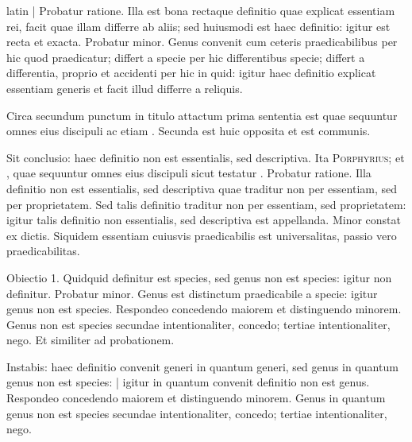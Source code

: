 \begin{otherlanguage*}{latin}
\pstart
\textnormal{|} Probatur ratione. Illa est bona rectaque definitio quae explicat essentiam rei, facit quae illam differre ab aliis; sed huiusmodi est haec definitio:
igitur est recta et exacta. Probatur minor. Genus convenit cum ceteris praedicabilibus per hic quod praedicatur; differt a specie per hic differentibus specie; differt a differentia, proprio et accidenti per hic in quid:
igitur haec definitio explicat essentiam generis et facit illud differre a reliquis. 
\pend

\pstart
Circa secundum punctum in titulo attactum prima sententia est  quae sequuntur omnes eius discipuli ac etiam . Secunda est huic opposita et est communis. 
\pend

\pstart
Sit conclusio:
haec definitio non est essentialis, sed descriptiva. Ita \textsc{Porphyrius};  et , quae sequuntur omnes eius discipuli sicut testatur . Probatur ratione. Illa definitio non est essentialis, sed descriptiva quae traditur non per essentiam, sed per proprietatem. Sed talis definitio traditur non per essentiam, sed proprietatem:
igitur talis definitio non essentialis, sed descriptiva est appellanda. Minor constat ex dictis. Siquidem essentiam cuiusvis praedicabilis est universalitas, passio vero praedicabilitas. 
\pend

\pstart
Obiectio 1. Quidquid definitur est species, sed genus non est species:
igitur non definitur. Probatur minor. Genus est distinctum praedicabile a specie:
igitur genus non est species. Respondeo concedendo maiorem et distinguendo minorem. Genus non est species secundae intentionaliter, concedo; tertiae intentionaliter, nego. Et similiter ad probationem. 
\pend

\pstart
Instabis:
haec definitio convenit generi in quantum generi, sed genus in quantum genus non est species:
\textnormal{|} igitur in quantum convenit definitio non est genus. Respondeo concedendo maiorem et distinguendo minorem. Genus in quantum genus non est species secundae intentionaliter, concedo; tertiae intentionaliter, nego. 
\pend


\end{otherlanguage*}
